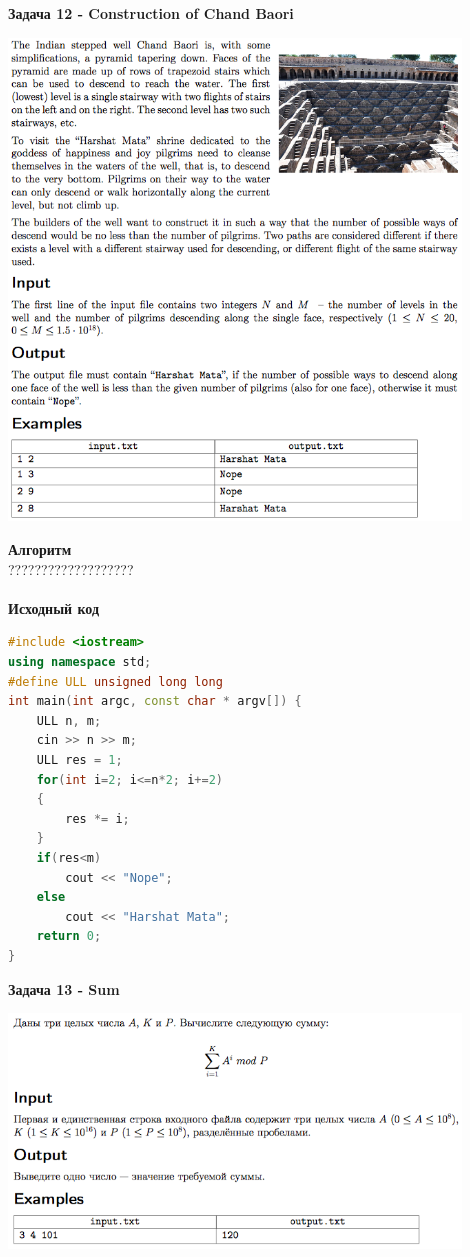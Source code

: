 \documentclass[a4paper,12pt]{article}
\begin{document}
\textbf{{\large Задача 12 - Construction of Chand Baori}} \\
\begin{center}
\includegraphics[width=0.9\textwidth]{OC_Siberia/OC_Siberia_12.png}\\ [1cm]
\end{center}
\newpage

\textbf{{\large Алгоритм}} \\
{\Huge ???????????????????} \\ 
\\
\textbf{{\large Исходный код}}
\begin{lstlisting}[language=C++]
#include <iostream>
using namespace std;
#define ULL unsigned long long
int main(int argc, const char * argv[]) {
    ULL n, m;
    cin >> n >> m;
    ULL res = 1;
    for(int i=2; i<=n*2; i+=2)
    {
        res *= i;
    }
    if(res<m)
        cout << "Nope";
    else
        cout << "Harshat Mata";
    return 0;
}
\end{lstlisting}

\textbf{{\large Задача 13 - Sum}} \\
\begin{center}
\includegraphics[width=0.9\textwidth]{OC_Siberia/OC_Siberia_13.png}\\ [1cm]
\end{center}
\newpage
\end{document}
